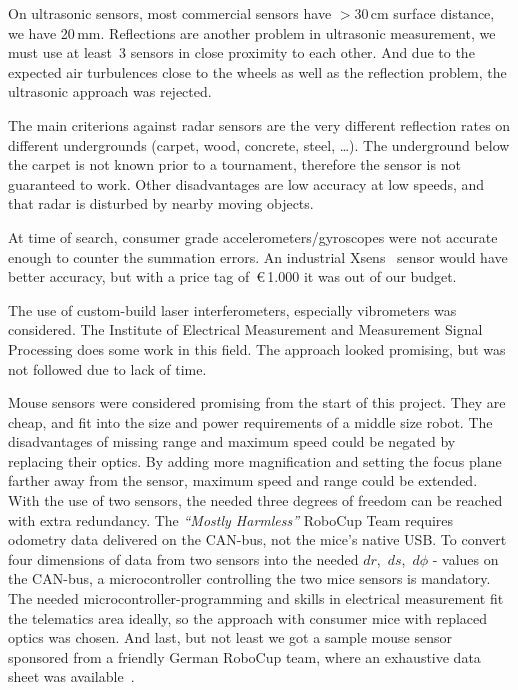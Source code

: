 \documentclass[12pt,a4paper]{article}
\newcommand{\MH}{\emph{``Mostly Harmless''} RoboCup Team\xspace}
\begin{document}
On ultrasonic sensors, most commercial sensors have $> $30\,cm surface distance, we have 20\,mm.
Reflections are another problem in ultrasonic measurement, we must use at least~3 sensors in close proximity to each other.
And due to the expected air turbulences close to the wheels as well as the reflection problem, the ultrasonic approach was rejected.

The main criterions against radar sensors are the very different reflection rates on different undergrounds (carpet, wood, concrete, steel, \dots).
The underground below the carpet is not known prior to a tournament, therefore the sensor is not guaranteed to work.
Other disadvantages are low accuracy at low speeds, and that radar is disturbed by nearby moving objects.

At time of search, consumer grade accelerometers/gyroscopes were not accurate enough to counter the summation errors.
An industrial Xsens~\cite{xsens} sensor would have better accuracy, but with a price tag of~\euro\,1.000 it was out of our budget.


The use of custom-build laser interferometers, especially vibrometers was considered.
The Institute of Electrical Measurement and Measurement Signal Processing does some work in this field.
The approach looked promising, but was not followed due to lack of time.

Mouse sensors were considered promising from the start of this project.
They are cheap, and fit into the size and power requirements of a middle size robot.
The disadvantages of missing range and maximum speed could be negated by replacing their optics.
By adding more magnification and setting the focus plane farther away from the sensor, maximum speed and range could be extended.\\
With the use of two sensors, the needed three degrees of freedom can be reached with extra redundancy. 
The \MH requires odometry data delivered on the CAN-bus, not the mice's native USB.
To convert four dimensions of data from two sensors into the needed $dr$,~$ds$,~$d\phi$ - values on the CAN-bus, a microcontroller controlling the two mice sensors is mandatory.\\
The needed microcontroller-programming and skills in electrical measurement fit the telematics area ideally, so the approach with consumer mice with replaced optics was chosen.
And last, but not least we got a sample mouse sensor sponsored from a friendly German RoboCup team, where an exhaustive data sheet was available~\cite{adns}.
\end{document}
